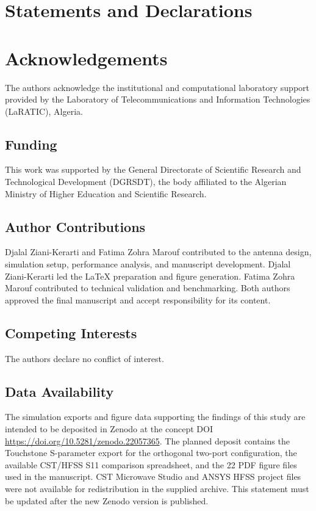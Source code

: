 \documentclass[referee,pdflatex,sn-mathphys-ay]{sn-jnl}
\begin{document}


\section*{Statements and Declarations}
\section*{Acknowledgements}
The authors acknowledge the institutional and computational laboratory support provided by the Laboratory of Telecommunications and Information Technologies (LaRATIC), Algeria.

\subsection*{Funding}
This work was supported by the General Directorate of Scientific Research and Technological Development (DGRSDT), the body affiliated to the Algerian Ministry of Higher Education and Scientific Research.

\subsection*{Author Contributions}
Djalal Ziani-Kerarti and Fatima Zohra Marouf contributed to the antenna design, simulation setup, performance analysis, and manuscript development. Djalal Ziani-Kerarti led the LaTeX preparation and figure generation. Fatima Zohra Marouf contributed to technical validation and benchmarking. Both authors approved the final manuscript and accept responsibility for its content.

\subsection*{Competing Interests}
The authors declare no conflict of interest.

\subsection*{Data Availability}
The simulation exports and figure data supporting the findings of this study are intended to be deposited in Zenodo at the concept DOI \url{https://doi.org/10.5281/zenodo.22057365}. The planned deposit contains the Touchstone S-parameter export for the orthogonal two-port configuration, the available CST/HFSS S11 comparison spreadsheet, and the 22 PDF figure files used in the manuscript. CST Microwave Studio and ANSYS HFSS project files were not available for redistribution in the supplied archive. This statement must be updated after the new Zenodo version is published.
\end{document}
